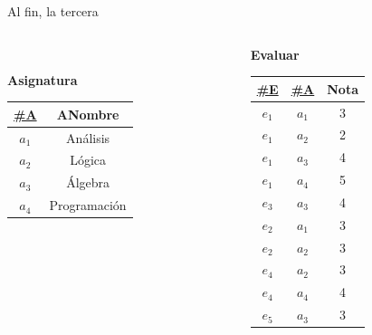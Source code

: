 \begin{frame}{Al fin, la tercera}
\begin{columns}[T]
\begin{column}{0.68\linewidth}
\begin{columns}[T]
\begin{column}{0.4\textwidth}
\begin{center}
\begin{tabular}{cc}
                        \end{tabular}
                    \end{center}
                \end{column}
                
            \end{columns}

            \begin{center}
                \textbf{Asignatura}\\[2mm]

                \begin{tabular}{cc}
                    \underline{\#A} & ANombre\\[1mm]
                    \hline
                    $a_1$ & An\'alisis\\
                    $a_2$ & L\'ogica \\
                    $a_3$ & \'Algebra\\
                    $a_4$ & Programaci\'on
                    
                \end{tabular}
            \end{center}
            
        \end{column}

        \begin{column}{0.3\linewidth}
            \vspace{6mm}
            \begin{center}
                \textbf{Evaluar}\\[2mm]

                \begin{tabular}{ccc}
                    \underline{\#E} & \underline{\#A} & Nota\\[1mm]
                    \hline
                    $e_1$ & $a_1$ & 3\\
                    $e_1$ & $a_2$ & 2\\
                    $e_1$ & $a_3$ & 4\\
                    $e_1$ & $a_4$ & 5\\
                    $e_3$ & $a_3$ & 4\\
                    $e_2$ & $a_1$ & 3\\
                    $e_2$ & $a_2$ & 3\\
                    $e_4$ & $a_2$ & 3\\
                    $e_4$ & $a_4$ & 4\\
                    $e_5$ & $a_3$ & 3\\
                \end{tabular}
            \end{center}
        \end{column}
    \end{columns}
\end{frame}


